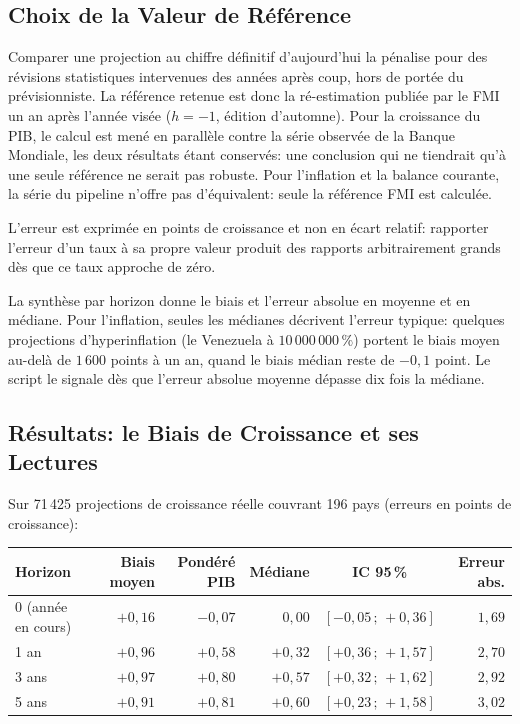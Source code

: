 \documentclass[11pt,a4paper]{article}
\begin{document}
\subsection{Choix de la Valeur de Référence}
Comparer une projection au chiffre définitif d'aujourd'hui la pénalise pour des révisions statistiques intervenues des années après coup, hors de portée du prévisionniste. La référence retenue est donc la ré-estimation publiée par le FMI un an après l'année visée ($h = -1$, édition d'automne). Pour la croissance du PIB, le calcul est mené en parallèle contre la série observée de la Banque Mondiale, les deux résultats étant conservés: une conclusion qui ne tiendrait qu'à une seule référence ne serait pas robuste. Pour l'inflation et la balance courante, la série du pipeline n'offre pas d'équivalent: seule la référence FMI est calculée.

L'erreur est exprimée en points de croissance et non en écart relatif: rapporter l'erreur d'un taux à sa propre valeur produit des rapports arbitrairement grands dès que ce taux approche de zéro.

La synthèse par horizon donne le biais et l'erreur absolue en moyenne et en médiane. Pour l'inflation, seules les médianes décrivent l'erreur typique: quelques projections d'hyperinflation (le Venezuela à $10\,000\,000\,\%$) portent le biais moyen au-delà de $1\,600$ points à un an, quand le biais médian reste de $-0{,}1$ point. Le script le signale dès que l'erreur absolue moyenne dépasse dix fois la médiane.

\subsection{Résultats: le Biais de Croissance et ses Lectures}
Sur 71\,425 projections de croissance réelle couvrant 196 pays (erreurs en points de croissance):

\begin{center}\small
\begin{tabular}{lrrrcr}
\hline
\textbf{Horizon} & \textbf{Biais moyen} & \textbf{Pondéré PIB} & \textbf{Médiane} & \textbf{IC 95\,\%} & \textbf{Erreur abs.} \\
\hline
0 (année en cours) & $+0{,}16$ & $-0{,}07$ & $0{,}00$ & $[-0{,}05\,;\,+0{,}36]$ & $1{,}69$ \\
1 an & $+0{,}96$ & $+0{,}58$ & $+0{,}32$ & $[+0{,}36\,;\,+1{,}57]$ & $2{,}70$ \\
3 ans & $+0{,}97$ & $+0{,}80$ & $+0{,}57$ & $[+0{,}32\,;\,+1{,}62]$ & $2{,}92$ \\
5 ans & $+0{,}91$ & $+0{,}81$ & $+0{,}60$ & $[+0{,}23\,;\,+1{,}58]$ & $3{,}02$ \\
\hline
\end{tabular}
\end{center}
\end{document}
